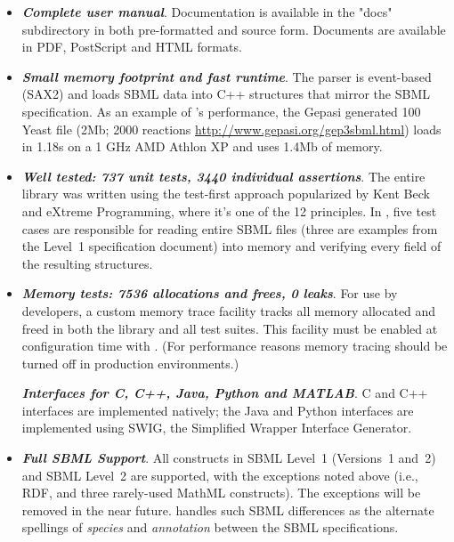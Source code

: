 \documentclass{sbmlmanual}
\begin{document}
\begin{itemize}
  
\item \textbf{\textsl{Complete user manual}}. Documentation is available in
  the "docs" subdirectory in both pre-formatted and source form.  Documents
  are available in PDF, PostScript and HTML formats.
  
\item \textbf{\textsl{Small memory footprint and fast runtime}}. The parser
  is event-based (SAX2) and loads SBML data into C++ structures that mirror
  the SBML specification.  As an example of \libsbml{}'s performance, the
  Gepasi generated 100 Yeast file (2Mb; 2000 reactions
  \url{http://www.gepasi.org/gep3sbml.html}) loads in 1.18s on a 1 GHz AMD
  Athlon XP and uses 1.4Mb of memory.
      
\item \textbf{\textsl{Well tested: 737 unit tests, 3440 individual
      assertions}}.  The entire library was written using the test-first
  approach popularized by Kent Beck and eXtreme Programming, where it's one
  of the 12 principles.  In \libsbml{}, five test cases are responsible for
  reading entire SBML files (three are examples from the Level~1
  specification document) into memory and verifying every field of the
  resulting structures.
      
\item \textbf{\textsl{Memory tests: 7536 allocations and frees, 0 leaks}}.
  For use by developers, a custom memory trace facility tracks all memory
  allocated and freed in both the library and all test suites.  This
  facility must be enabled at \libsbml{} configuration time with
  .  (For performance reasons
  memory tracing should be turned off in production environments.)
  
  \textbf{\textsl{Interfaces for C, C++, Java, Python and MATLAB}}.  C and
  C++ interfaces are implemented natively; the Java and Python interfaces
  are implemented using SWIG, the Simplified Wrapper Interface Generator.

\item \textbf{\textsl{Full SBML Support}}.  All constructs in SBML Level~1
  (Versions~1 and~2) and SBML Level~2 are supported, with the exceptions
  noted above (i.e., RDF, and three rarely-used MathML constructs).  The
  exceptions will be removed in the near future.  \libsbml{} handles such
  SBML differences as the alternate spellings of \emph{species} and
  \emph{annotation} between the SBML specifications.
  

\end{itemize}
\end{document}
